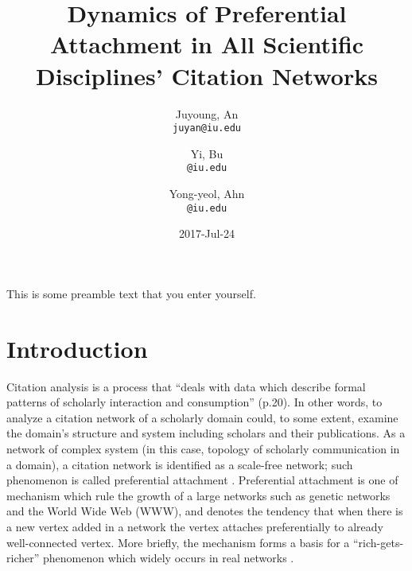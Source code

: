 \documentclass{article}
\title{Dynamics of Preferential Attachment in All Scientific Disciplines’ Citation Networks }
\author{
  Juyoung, An\\
  \texttt{juyan@iu.edu}
  \and
  Yi, Bu\\
  \texttt{@iu.edu}
  \and
  Yong-yeol, Ahn\\
  \texttt{@iu.edu}
}
\date {2017-Jul-24}
\begin{document}
\maketitle
\tableofcontents
\newpage

This is some preamble text that you enter yourself.

\section{Introduction}
Citation analysis is a process that “deals with data which describe formal patterns of scholarly interaction and consumption” \cite{cronin1994scholar} (p.20). In other words, to analyze a citation network of a scholarly domain could, to some extent, examine the domain’s structure and system including scholars and their publications. As a network of complex system (in this case, topology of scholarly communication in a domain), a citation network is identified as a scale-free network; such phenomenon is called preferential attachment \cite{barabasi1999mean}. Preferential attachment is one of mechanism which rule the growth of a large networks such as genetic networks and the World Wide Web (WWW), and denotes the tendency that when there is a new vertex added in a network the vertex attaches preferentially to already well-connected vertex. More briefly, the mechanism forms a basis for a “rich-gets-richer” phenomenon which widely occurs in real networks \cite{barabasi1999emergence}. 
\end{document}
